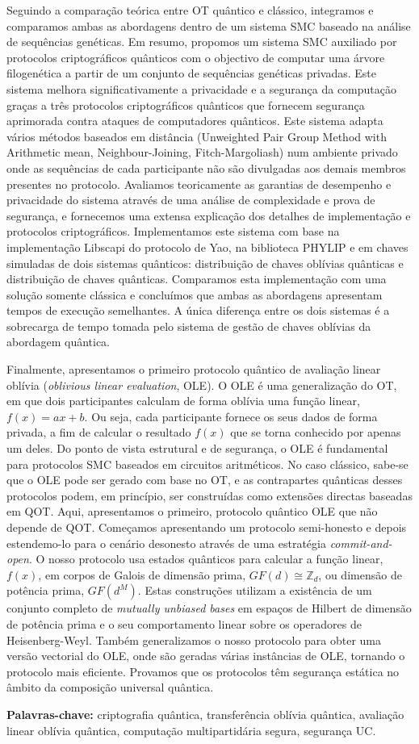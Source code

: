 Seguindo a comparação teórica entre OT quântico e clássico, integramos e comparamos ambas as abordagens dentro de um sistema SMC baseado na análise de sequências genéticas. Em resumo, propomos um sistema SMC auxiliado por protocolos criptográficos quânticos com o objectivo de computar uma árvore filogenética a partir de um conjunto de sequências genéticas privadas. Este sistema melhora significativamente a privacidade e a segurança da computação graças a três protocolos criptográficos quânticos que fornecem segurança aprimorada contra ataques de computadores quânticos. Este sistema adapta vários métodos baseados em distância (Unweighted Pair Group Method with Arithmetic mean, Neighbour-Joining, Fitch-Margoliash) num ambiente privado onde as sequências de cada participante não são divulgadas aos demais membros presentes no protocolo. Avaliamos teoricamente as garantias de desempenho e privacidade do sistema através de uma análise de complexidade e prova de segurança, e fornecemos uma extensa explicação dos detalhes de implementação e protocolos criptográficos. Implementamos este sistema com base na implementação Libscapi do protocolo de Yao, na biblioteca PHYLIP e em chaves simuladas de dois sistemas quânticos: distribuição de chaves oblívias quânticas e distribuição de chaves quânticas. Comparamos esta implementação com uma solução somente clássica e concluímos que ambas as abordagens apresentam tempos de execução semelhantes. A única diferença entre os dois sistemas é a sobrecarga de tempo tomada pelo sistema de gestão de chaves oblívias da abordagem quântica.

Finalmente, apresentamos o primeiro protocolo quântico de  avaliação linear oblívia (\textit{oblivious linear evaluation}, OLE). O OLE é uma generalização do OT, em que dois participantes calculam de forma oblívia uma função linear, $f(x) = ax + b$. Ou seja, cada participante fornece os seus dados de forma privada, a fim de calcular o resultado $f(x)$ que se torna conhecido por apenas um deles. Do ponto de vista estrutural e de segurança, o OLE é fundamental para protocolos SMC baseados em circuitos aritméticos. No caso clássico, sabe-se que o OLE pode ser gerado com base no OT, e as contrapartes quânticas desses protocolos podem, em princípio, ser construídas como extensões directas baseadas em QOT. Aqui, apresentamos o primeiro, protocolo quântico OLE que não depende de QOT. Começamos apresentando um protocolo semi-honesto e depois estendemo-lo para o cenário desonesto através de uma estratégia \textit{commit-and-open}. O nosso protocolo usa estados quânticos para calcular a função linear, $f(x)$, em corpos de Galois de dimensão prima, $GF(d) \cong \mathbb{Z}_d$, ou dimensão de potência prima, $GF(d^M)$. Estas construções utilizam a existência de um conjunto completo de \textit{mutually unbiased bases} em espaços de Hilbert de dimensão de potência prima e o seu comportamento linear sobre os operadores de Heisenberg-Weyl. Também generalizamos o nosso protocolo para obter uma versão vectorial do OLE, onde são geradas várias instâncias de OLE, tornando o protocolo mais eficiente. Provamos que os protocolos têm segurança estática no âmbito da composição universal quântica.

\vfill
\begin{flushleft}
\textbf{Palavras-chave:} criptografia qu\^{a}ntica, transferência oblívia quântica, avaliação linear oblívia quântica, computação multipartidária segura, segurança UC.
\end{flushleft}
